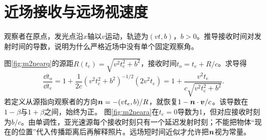 \section{近场接收与远场视速度}
\begin{example}\label{ex:m2nearretarded}
观察者在原点，发光点沿$x$轴以$v$运动，轨迹为$(vt,b)$，$b>0$。推导接收时间对发射时间的导数，说明为什么严格近场中没有单个固定观察角。
\end{example}
\begin{solution}
图\ref{fig:m2nearq}的源距$R(t_e)=\sqrt{v^2t_e^2+b^2}$，接收时间$t_o=t_e+R/c$。求导得
\[
 \frac{\dd t_o}{\dd t_e}
 =1+\frac1{2c}(v^2t_e^2+b^2)^{-1/2}(2v^2t_e)
 =1+\frac{v^2t_e}{c\sqrt{v^2t_e^2+b^2}}.
\]
若定义从源指向观察者的方向$\bm{n}=-(vt_e,b)/R$，就恢复$1-\bm{n}\cdot\bm{v}/c$。该导数在$1-\beta$与$1+\beta$之间，始终为正。
图\ref{fig:m2neara}在$t_e=0$导数为1，但对应接收时刻为$b/c$。由单调性，亚光速源每个接收时刻只有一个延迟发射时刻；不能把物体“现在的位置”代入传播距离后再解释照片。远场短时间近似才允许把$\bm{n}$视为常量。
\end{solution}

